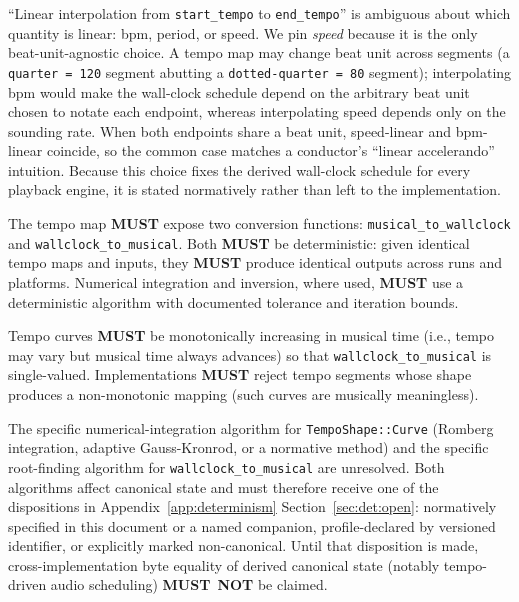 \documentclass[11pt,letterpaper]{report}
\newcounter{requirement}[chapter]
\newcommand{\MUST}{\textbf{MUST}}
\newcommand{\MUSTNOT}{\textbf{MUST}\nobreak\ \textbf{NOT}}
\begin{document}
\begin{rationale}
  ``Linear interpolation from \texttt{start\_tempo} to
  \texttt{end\_tempo}'' is ambiguous about which quantity is linear:
  bpm, period, or speed. We pin \emph{speed} because it is the only
  beat-unit-agnostic choice. A tempo map may change beat unit across
  segments (a \texttt{quarter = 120} segment abutting a
  \texttt{dotted-quarter = 80} segment); interpolating bpm would make
  the wall-clock schedule depend on the arbitrary beat unit chosen to
  notate each endpoint, whereas interpolating speed depends only on
  the sounding rate. When both endpoints share a beat unit, speed-linear
  and bpm-linear coincide, so the common case matches a conductor's
  ``linear accelerando'' intuition. Because this choice fixes the
  derived wall-clock schedule for every playback engine, it is stated
  normatively rather than left to the implementation.
\end{rationale}

\begin{requirement}
  \label{req:time:tempo-map-conversion}
  The tempo map \MUST{} expose two conversion functions:
  \texttt{musical\_to\_wallclock} and \texttt{wallclock\_to\_musical}.
  Both \MUST{} be deterministic: given identical tempo maps and inputs,
  they \MUST{} produce identical outputs across runs and platforms.
  Numerical integration and inversion, where used, \MUST{} use a
  deterministic algorithm with documented tolerance and iteration
  bounds.

  Tempo curves \MUST{} be monotonically increasing in musical time
  (i.e., tempo may vary but musical time always advances) so that
  \texttt{wallclock\_to\_musical} is single-valued. Implementations
  \MUST{} reject tempo segments whose shape produces a non-monotonic
  mapping (such curves are musically meaningless).
\end{requirement}

\begin{openquestion}
  The specific numerical-integration algorithm for
  \texttt{TempoShape::Curve} (Romberg integration, adaptive
  Gauss-Kronrod, or a normative method) and the specific
  root-finding algorithm for \texttt{wallclock\_to\_musical} are
  unresolved. Both algorithms affect canonical state and must
  therefore receive one of the dispositions in
  Appendix~\ref{app:determinism}
  Section~\ref{sec:det:open}: normatively specified in this
  document or a named companion, profile-declared by versioned
  identifier, or explicitly marked non-canonical. Until that
  disposition is made, cross-implementation byte equality of
  derived canonical state (notably tempo-driven audio
  scheduling) \MUSTNOT{} be claimed.
\end{openquestion}
\end{document}
